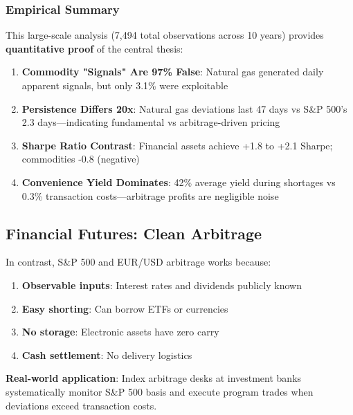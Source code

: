 \documentclass[12pt,a4paper]{article}
\begin{document}
\subsubsection{Empirical Summary}

This large-scale analysis (7,494 total observations across 10 years) provides \textbf{quantitative proof} of the central thesis:

\begin{enumerate}
    \item \textbf{Commodity "Signals" Are 97\% False}: Natural gas generated daily apparent signals, but only 3.1\% were exploitable
    \item \textbf{Persistence Differs 20x}: Natural gas deviations last 47 days vs S\&P 500's 2.3 days—indicating fundamental vs arbitrage-driven pricing
    \item \textbf{Sharpe Ratio Contrast}: Financial assets achieve +1.8 to +2.1 Sharpe; commodities -0.8 (negative)
    \item \textbf{Convenience Yield Dominates}: 42\% average yield during shortages vs 0.3\% transaction costs—arbitrage profits are negligible noise
\end{enumerate}

\subsection{Financial Futures: Clean Arbitrage}

In contrast, S\&P 500 and EUR/USD arbitrage works because:

\begin{enumerate}
    \item \textbf{Observable inputs}: Interest rates and dividends publicly known
    \item \textbf{Easy shorting}: Can borrow ETFs or currencies
    \item \textbf{No storage}: Electronic assets have zero carry
    \item \textbf{Cash settlement}: No delivery logistics
\end{enumerate}

\textbf{Real-world application}: Index arbitrage desks at investment banks systematically monitor S\&P 500 basis and execute program trades when deviations exceed transaction costs.

\newpage
\end{document}
